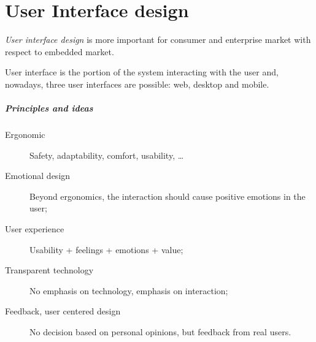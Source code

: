 \chapter{User Interface design}
\emph{User interface design} is more important for consumer and enterprise market with respect to embedded market. 

User interface is the portion of the system interacting with the user and, nowadays, three user interfaces are possible: web, desktop and mobile.


\paragraph{Principles and ideas}
\begin{description}
\item [Ergonomic] Safety, adaptability, comfort, usability, \dots
\item [Emotional design] Beyond ergonomics, the interaction should cause positive emotions in the user;
\item [User experience] Usability + feelings + emotions + value;
\item [Transparent technology] No emphasis on technology, emphasis on interaction;
\item [Feedback, user centered design] No decision based on personal opinions, but feedback from real users.
\end{description}

